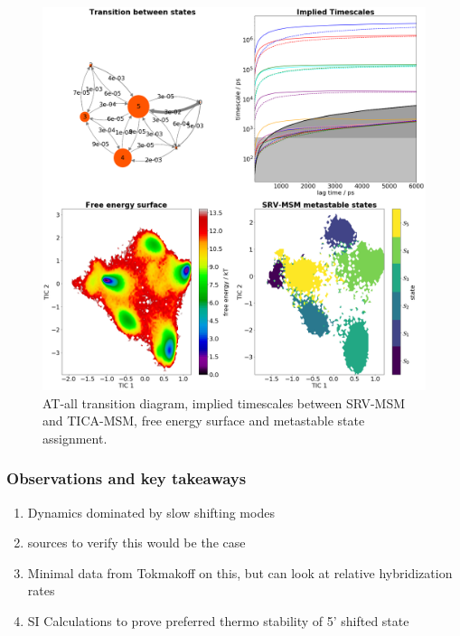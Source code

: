\documentclass[journal=jpcbfk,manuscript=article]{achemso}
\begin{document}
\begin{figure}[ht!]
	\begin{center}
        \includegraphics[width=\textwidth]{Figs/skeleton/AT-all_vis.png}
        \caption{AT-all transition diagram, implied timescales between SRV-MSM and TICA-MSM, free energy surface and metastable state assignment.}
        \label{fig:sample_fray}
	\end{center}
\end{figure}

\subsubsection{\label{sec:Results}Observations and key takeaways}
\begin{enumerate}
	\item Dynamics dominated by slow shifting modes
	\item sources to verify this would be the case
	\item Minimal data from Tokmakoff on this, but can look at relative hybridization rates
	\item SI Calculations to prove preferred thermo stability of 5’ shifted state
\end{enumerate}  
\end{document}
